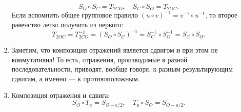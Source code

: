 \begin{enumerate}
\begin{equation}\label{SOSC}
S_O\circ S_C=T_{2CO},\quad S_C\circ S_O=T_{2OC}.
\end{equation}
Если вспомнить общее групповое правило $(u\circ v)^{-1} = v^{-1}\circ u^{-1}$, то второе равенство легко получить из первого:
$$
T_{2OC} = T_{2CO}^{-1} = (S_O\circ S_C)^{-1} = S_C^{-1}\circ S_O^{-1}=S_C\circ S_O.
$$
\item Заметим, что композиция отражений является сдвигом и при этом не коммутативна! То есть, отражения, производимые в разной последовательности, приводят, вообще говоря, к разным результирующим сдвигам, а именно --- к противоположным.
\item Композиция отражения и сдвига:
\begin{equation}\label{SOTa}
S_O\circ T_a = S_{O-a/2},\quad T_a\circ S_O = S_{O+a/2}.
\end{equation}


\end{enumerate}
